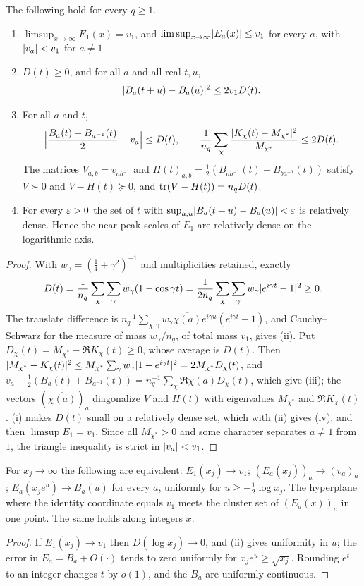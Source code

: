\begin{theorem}\label{zer:thm:peak}
The following hold for every $q\ge1$.
\begin{enumerate}[label=\textup{(\roman*)}]
\item $\limsup_{x\to\infty}E_1(x)=v_1$, and $\limsup_{x\to\infty}\lvert E_a(x)\rvert\le v_1$ for every
$a$, with $\lvert v_a\rvert<v_1$ for $a\ne1$.
\item $D(t)\ge0$, and for all $a$ and all real $t,u$,
\[
 \lvert B_a(t+u)-B_a(u)\rvert^2\le2v_1D(t).
\]
\item For all $a$ and $t$,
\[
 \Bigl|\frac{B_a(t)+B_{a^{-1}}(t)}2-v_a\Bigr|\le D(t),\qquad
 \frac1{n_q}\sum_\chi\frac{\lvert K_\chi(t)-M_{\chi^*}\rvert^2}{M_{\chi^*}}\le2D(t).
\]
The matrices $V_{a,b}=v_{ab^{-1}}$ and $H(t)_{a,b}=\tfrac12(B_{ab^{-1}}(t)+B_{ba^{-1}}(t))$ satisfy
$V\succ0$ and $V-H(t)\succeq0$, and $\operatorname{tr}(V-H(t))=n_qD(t)$.
\item For every $\varepsilon>0$ the set of $t$ with $\sup_{a,u}\lvert B_a(t+u)-B_a(u)\rvert<\varepsilon$ is relatively
dense. Hence the near-peak scales of $E_1$ are relatively dense on the logarithmic axis.
\end{enumerate}
\end{theorem}
\begin{proof}
With $w_\gamma=(\tfrac14+\gamma^2)^{-1}$ and multiplicities retained, exactly
\[
 D(t)=\frac1{n_q}\sum_\chi\sum_\gamma w_\gamma(1-\cos\gamma t)=\frac1{2n_q}\sum_\chi\sum_\gamma w_\gamma\lvert e^{i\gamma t}-1\rvert^2\ge0 .
\]
The translate difference is $n_q^{-1}\sum_{\chi,\gamma}w_\gamma\overline{\chi(a)}e^{i\gamma u}(e^{i\gamma t}-1)$, and
Cauchy--Schwarz for the measure of mass $w_\gamma/n_q$, of total mass $v_1$, gives (ii). Put
$D_\chi(t)=M_{\chi^*}-\Re K_\chi(t)\ge0$, whose average is $D(t)$. Then
$\lvert M_{\chi^*}-K_\chi(t)\rvert^2\le M_{\chi^*}\sum_\gamma w_\gamma\lvert1-e^{i\gamma t}\rvert^2=2M_{\chi^*}D_\chi(t)$, and
$v_a-\tfrac12(B_a(t)+B_{a^{-1}}(t))=n_q^{-1}\sum_\chi\Re\chi(a)D_\chi(t)$, which give (iii); the
vectors $(\overline{\chi(a)})_a$ diagonalize $V$ and $H(t)$ with eigenvalues $M_{\chi^*}$ and
$\Re K_\chi(t)$. (i) makes $D(t)$ small on a relatively dense set, which with
(ii) gives (iv), and then $\limsup E_1=v_1$. Since all $M_{\chi^*}>0$ and some character separates
$a\ne1$ from $1$, the triangle inequality is strict in $\lvert v_a\rvert<v_1$.
\end{proof}

\begin{corollary}\label{zer:cor:peak}
For $x_j\to\infty$ the following are equivalent: $E_1(x_j)\to v_1$;
$(E_a(x_j))_a\to(v_a)_a$; $E_a(x_je^u)\to B_a(u)$ for every $a$, uniformly for
$u\ge-\tfrac12\log x_j$. The hyperplane where the identity coordinate equals $v_1$ meets the
cluster set of $(E_a(x))_a$ in one point. The same holds along integers $x$.
\end{corollary}
\begin{proof}
If $E_1(x_j)\to v_1$ then $D(\log x_j)\to0$, and (ii) gives uniformity in $u$; the error in
$E_a=B_a+O(\cdot)$ tends to zero uniformly for $x_je^u\ge\sqrt{x_j}$. Rounding $e^t$ to an integer
changes $t$ by $o(1)$, and the $B_a$ are uniformly continuous.
\end{proof}

